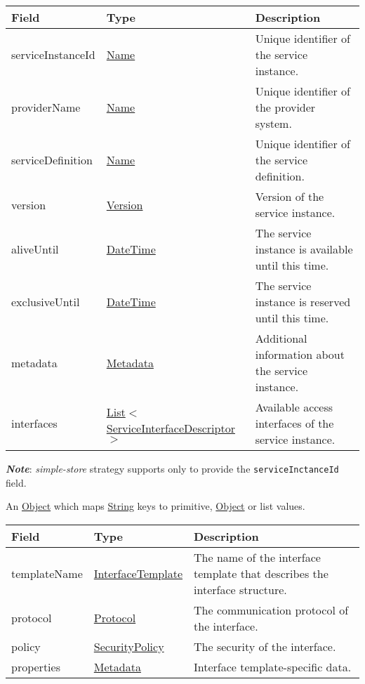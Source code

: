 \documentclass[a4paper]{arrowhead}
\newcommand{\pref}[1]{{\textcolor{ArrowheadGrey}{\hyperref[sec:model:primitives:#1]{#1}}}}
\begin{document}

\begin{table}[ht!]
\begin{tabularx}{\textwidth}{| p{3cm} | p{5.1cm} | X |} \hline
\rowcolor{gray!33} Field & Type & Description \\ \hline
serviceInstanceId & \pref{Name} & Unique identifier of the service instance. \\ \hline
providerName & \pref{Name} & Unique identifier of the provider system. \\ \hline
serviceDefinition & \pref{Name} & Unique identifier of the service definition. \\ \hline
version & \pref{Version} & Version of the service instance. \\ \hline
aliveUntil & \pref{DateTime} & The service instance is available until this time. \\ \hline
exclusiveUntil & \pref{DateTime} & The service instance is reserved until this time. \\ \hline
metadata & \hyperref[sec:model:Metadata]{Metadata} & Additional information about the service instance. \\ \hline
interfaces & \pref{List}$<$\hyperref[sec:model:ServiceInterfaceDescriptor]{ServiceInterfaceDescriptor}$>$ & Available access interfaces of the service instance. \\ \hline
\end{tabularx}
\end{table}

\textbf{\textit{Note}}: \textit{simple-store} strategy supports only to provide the \texttt{serviceInctanceId} field. 


An \pref{Object} which maps \pref{String} keys to primitive, \pref{Object} or list values.

\clearpage

 
\begin{table}[ht!]
\begin{tabularx}{\textwidth}{| p{2.5cm} | p{3cm} | X |} \hline
\rowcolor{gray!33} Field & Type & Description \\ \hline
templateName & \pref{InterfaceTemplate} & The name of the interface template that describes the interface structure. \\ \hline
protocol & \pref{Protocol} & The communication protocol of the interface. \\ \hline
policy & \pref{SecurityPolicy} & The security of the interface. \\ \hline
properties &\hyperref[sec:model:Metadata]{Metadata} & Interface template-specific data. \\ \hline
\end{tabularx}
\end{table}
\end{document}
